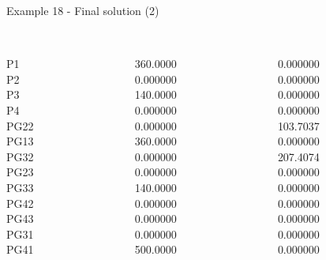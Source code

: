 \begin{frame}{Example 18 - Final solution (2)}

\begin{columns}[t]
\begin{column}{0.3\textwidth}
\\

P1\\
P2\\
P3\\
P4\\
PG22\\
PG13\\
PG32\\
PG23\\
PG33\\
PG42\\
PG43\\
PG31\\
PG41\\
\end{column}
\begin{column}{0.3\textwidth}
\\

360.0000\\
0.000000\\
140.0000\\
0.000000\\
0.000000\\
360.0000\\
0.000000\\
0.000000\\
140.0000\\
0.000000\\
0.000000\\
0.000000\\
500.0000\\
\end{column}

\begin{column}{0.3\textwidth}
\\
0.000000\\
0.000000\\
0.000000\\
0.000000\\
103.7037\\
0.000000\\
207.4074\\
0.000000\\
0.000000\\
0.000000\\
0.000000\\
0.000000\\
0.000000\\
\end{column}
\end{columns}
\end{frame}


